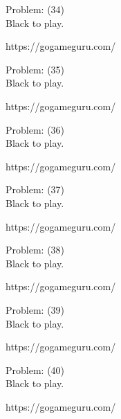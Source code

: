 \documentclass[11pt]{article}
\begin{document}
\begin{minipage}[t]{0.5\textwidth}
  {\centering
  
Problem: (34)\\
Black to play.

https://gogameguru.com/\\
  }
\end{minipage}
\begin{minipage}[t]{0.5\textwidth}
  {\centering
  
Problem: (35)\\
Black to play.

https://gogameguru.com/\\
  }
\end{minipage}
\begin{minipage}[t]{0.5\textwidth}
  {\centering
  
Problem: (36)\\
Black to play.

https://gogameguru.com/\\
  }
\end{minipage}
\begin{minipage}[t]{0.5\textwidth}
  {\centering
  
Problem: (37)\\
Black to play.

https://gogameguru.com/\\
  }
\end{minipage}
\begin{minipage}[t]{0.5\textwidth}
  {\centering
  
Problem: (38)\\
Black to play.

https://gogameguru.com/\\
  }
\end{minipage}
\begin{minipage}[t]{0.5\textwidth}
  {\centering
  
Problem: (39)\\
Black to play.

https://gogameguru.com/\\
  }
\end{minipage}
\begin{minipage}[t]{0.5\textwidth}
  {\centering
  
Problem: (40)\\
Black to play.

https://gogameguru.com/\\
  }
\end{minipage}
\end{document}

